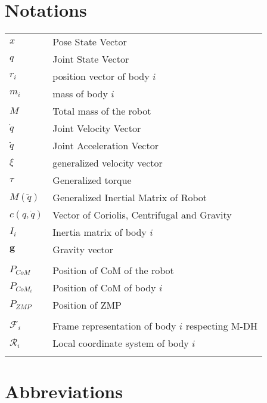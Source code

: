 \documentclass{thesisreport}
\begin{document}
\section*{Notations}
    \begin{tabular}{p{3cm}p{10cm}}
        $x$ & Pose State Vector \\
        $q$ & Joint State Vector \\
        $r_i$ & position vector of body $i$ \\
        $m_i$ & mass of body $i$ \\
        $M$ & Total mass of the robot \\
        $\dot{q}$ & Joint Velocity Vector \\
        $\ddot{q}$ & Joint Acceleration Vector \\
        $\xi$ & generalized velocity vector \\
        $\tau$ & Generalized torque \\
        $M(\ddot{q})$ & Generalized Inertial Matrix of Robot \\
        $c(q, \dot{q})$ & Vector of Coriolis, Centrifugal and Gravity \\
        $I_i$ & Inertia matrix of body $i$ \\
        $\mathbf{g}$ & Gravity vector \\
         & \\
        $P_{CoM}$ & Position of CoM of the robot \\
        $P_{CoM_i}$ & Position of CoM of body $i$ \\
        $P_{ZMP}$ & Position of ZMP \\

        & \\

        $\mathcal{F}_i$ & Frame representation of body $i$ respecting M-DH \\
        $\mathcal{R}_i$ & Local coordinate system of body $i$ \\
        
        & \\
        



    \end{tabular}

\newpage

\section*{Abbreviations}
\end{document}
